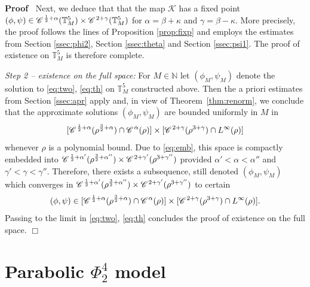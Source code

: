 \documentclass[a4paper,11pt]{article}
\newenvironment{proof}{\noindent\textbf{Proof\ }}{\hspace*{\fill}$\Box$\medskip}
\numberwithin{equation}{section}
\newcommand{\CC}{\mathscr{C} \hspace{.1em}}
\newcommand{\N}{\mathbb{N}}
\newcommand{\8}{\infty}
\begin{document}
\begin{proof}
Next, we deduce that that the map $\mathcal{K}$ has a fixed point $(\phi,\psi)\in \CC^{\frac 12+\alpha} (\mathbb{T}_{M}^{5})\times \CC^{2+\gamma}(\mathbb{T}_{M}^{5})$ for $\alpha=\beta+\kappa$ and $\gamma=\beta-\kappa$. More precisely, the proof follows the lines of Proposition \ref{prop:fixp} and employs the estimates from Section \ref{ssec:phi2}, Section \ref{ssec:theta} and Section \ref{ssec:psi1}. The proof of existence on $\mathbb{T}^{5}_{M}$ is therefore complete.




 \emph{Step 2 -- existence on the full space:} For $M\in\N$ let  $(\phi_{M},\psi_{M})$ denote the solution to \eqref{eq:two}, \eqref{eq:th} on $\mathbb{T}^{5}_{M}$  constructed above.
Then  the a priori estimates from Section \ref{ssec:apr} apply and, in view of Theorem~\ref{thm:renorm}, we conclude that the approximate solutions $(\phi_{M},\psi_{M})$ are bounded uniformly in $M$ in
$$[ \CC^{\frac 12+\alpha}(\rho^{\frac 32+\alpha})\cap \CC^{\alpha}(\rho)]\times[\CC^{2+\gamma}(\rho^{3+\gamma})\cap L^{\infty}(\rho)]$$
whenever $\rho$ is a polynomial bound. Due to \eqref{eq:emb}, this space is compactly embedded into $\CC^{\frac 12+\alpha'}(\rho^{\frac 32+\alpha''})\times\CC^{2+\gamma'}(\rho^{3+\gamma''})$ provided $\alpha'<\alpha<\alpha''$ and $\gamma'<\gamma<\gamma''$. Therefore, there exists a subsequence, still denoted $(\phi_{M},\psi_{M})$ which converges in $\CC^{\frac 12+\alpha'}(\rho^{\frac 32+\alpha''})\times\CC^{2+\gamma'}(\rho^{3+\gamma''})$ to certain
$$(\phi,\psi)\in  [ \CC^{\frac 12+\alpha}(\rho^{\frac 32+\alpha})\cap \CC^{\alpha}(\rho)]\times[\CC^{2+\gamma}(\rho^{3+\gamma})\cap L^{\infty}(\rho)].$$
Passing to the limit in  \eqref{eq:two}, \eqref{eq:th} concludes the proof of existence on the full space.
\end{proof}





\section{Parabolic $\Phi^4_2$ model}
\label{sec:42}
\end{document}
